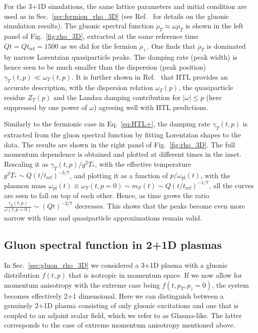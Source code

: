 \documentclass[]{webofc}
\newcommand{\tpert}{t}
\newcommand{\mrm}{\mathrm}
\newcommand{\Q}{Q}
\newcommand{\wplas}{\omega_{\mrm{pl}}}
\newcommand{\fig}{Fig.~}
\newcommand{\eq}{Eq.~}
\newcommand{\se}{Sec.~}
\newcommand{\re}{Ref.~}
\begin{document}
For the 3+1D simulations, the same lattice parameters and initial condition are used as in \se\ref{sec:fermion_rho_3D} (see \re\cite{Boguslavski:2018beu} for details on the gluonic simulation results).
The gluonic spectral function $\dot\rho_T \approx \omega \rho_T$ is shown in the left panel of \fig\ref{fig:rho_3D}, extracted at the same reference time $\Q \tpert = \Q t_{\text{ref}} = 1500$ as we did for the fermion $\rho_+$. One finds that $\dot\rho_T$ is dominated by narrow Lorentzian quasiparticle peaks. The damping rate (peak width) is hence seen to be much smaller than the dispersion (peak position) $\gamma_T(t,p) \ll \omega_T(t,p)$. It is further shown in \re\cite{Boguslavski:2018beu} that HTL provides an accurate description, with the dispersion relation $\omega_T(p)$, the quasiparticle residue $Z_T(p)$ and the Landau damping contribution for $|\omega| \leq p$ (here suppressed by one power of $\omega$) agreeing well with HTL predictions. 

Similarly to the fermionic case in \eq\eqref{eq:HTL+}, the damping rate $\gamma_T(t,p)$ is extracted from the gluon spectral function by fitting Lorentzian shapes to the data. The results are shown in the right panel of \fig\ref{fig:rho_3D}. The full momentum dependence is obtained and plotted at different times in the inset. Rescaling it as $\gamma_T(t,p)/g^2 T_*$, with the effective temperature $g^2 T_* \sim Q (t/t_{\text{ref}})^{-3/7}$, and plotting it as a function of $p/\wplas(t)$, with the plasmon mass $\wplas(t) \equiv \omega_T(t,p{=}0) \sim m_F(t) \sim Q (t/t_{\text{ref}})^{-1/7}$, all the curves are seen to fall on top of each other. Hence, as time grows the ratio $\frac{\gamma_{T}(t,p)}{\omega(t,p{=}0)} \sim (Q t)^{-2/7}$ decreases. This shows that the peaks become even more narrow with time and quasiparticle approximations remain valid. 



\subsection{Gluon spectral function in 2+1D plasmas}
\label{sec:gluon_rho_2D}

In \se\ref{sec:gluon_rho_3D} we considered a 3+1D plasma with a gluonic distribution $f(t,p)$ that is isotropic in momentum space. If we now allow for momentum anisotropy with the extreme case being $f(t,p_T, p_z{=}0)$, the system becomes effectively 2+1 dimensional. Here we can distinguish between a genuinely 2+1D plasma consisting of only gluonic excitations and one that is coupled to an adjoint scalar field, which we refer to as Glasma-like. The latter corresponds to the case of extreme momentum anisotropy mentioned above.
\end{document}

